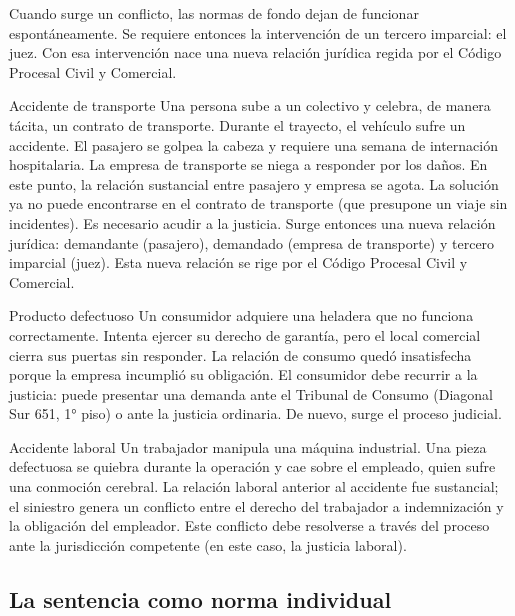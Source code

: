 \documentclass[12pt,oneside]{book}
\begin{document}
Cuando surge un conflicto, las normas de fondo dejan de funcionar espontáneamente. Se requiere entonces la intervención de un tercero imparcial: el juez. Con esa intervención nace una nueva relación jurídica regida por el Código Procesal Civil y Comercial.

\begin{example}{Accidente de transporte}
Una persona sube a un colectivo y celebra, de manera tácita, un contrato de transporte. Durante el trayecto, el vehículo sufre un accidente. El pasajero se golpea la cabeza y requiere una semana de internación hospitalaria. La empresa de transporte se niega a responder por los daños. En este punto, la relación sustancial entre pasajero y empresa se agota. La solución ya no puede encontrarse en el contrato de transporte (que presupone un viaje sin incidentes). Es necesario acudir a la justicia. Surge entonces una nueva relación jurídica: demandante (pasajero), demandado (empresa de transporte) y tercero imparcial (juez). Esta nueva relación se rige por el Código Procesal Civil y Comercial.
\end{example}

\begin{example}{Producto defectuoso}
Un consumidor adquiere una heladera que no funciona correctamente. Intenta ejercer su derecho de garantía, pero el local comercial cierra sus puertas sin responder. La relación de consumo quedó insatisfecha porque la empresa incumplió su obligación. El consumidor debe recurrir a la justicia: puede presentar una demanda ante el Tribunal de Consumo (Diagonal Sur 651, 1° piso) o ante la justicia ordinaria. De nuevo, surge el proceso judicial.
\end{example}

\begin{example}{Accidente laboral}
Un trabajador manipula una máquina industrial. Una pieza defectuosa se quiebra durante la operación y cae sobre el empleado, quien sufre una conmoción cerebral. La relación laboral anterior al accidente fue sustancial; el siniestro genera un conflicto entre el derecho del trabajador a indemnización y la obligación del empleador. Este conflicto debe resolverse a través del proceso ante la jurisdicción competente (en este caso, la justicia laboral).
\end{example}

\subsection{La sentencia como norma individual}
\end{document}
